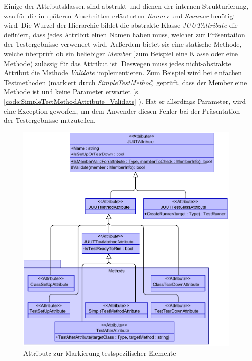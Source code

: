 Einige der Attributsklassen sind abstrakt und dienen der internen Strukturierung, was für die in späteren Abschnitten erläuterten \textit{Runner} und \textit{Scanner} benötigt wird. Die Wurzel der Hierarchie bildet die abstrakte Klasse \textit{JUUTAttribute} die definiert, dass jedes Attribut einen Namen haben muss, welcher zur Präsentation der Testergebnisse verwendet wird. Außerdem bietet sie eine statische Methode, welche überprüft ob ein beliebiger \textit{Member} (zum Beispiel eine Klasse oder eine Methode) zulässig für das Attribut ist. Deswegen muss jedes nicht-abstrakte Attribut die Methode \textit{Validate} implementieren. Zum Beispiel wird bei einfachen Testmethoden (markiert durch \textit{SimpleTestMethod}) geprüft, dass der Member eine Methode ist und keine Parameter erwartet (s. \autoref{code:SimpleTestMethodAttribute_Validate} ). Hat er allerdings Parameter, wird eine Exception geworfen, um dem Anwender diesen Fehler bei der Präsentation der Testergebnisse mitzuteilen.

\begin{figure}[h]
\centering
\includegraphics[width=0.9\linewidth]{images/Kapitel_Ergebnis/Attributes}
\caption[Attribute zur Markierung testspezifischer Elemente]{Attribute zur Markierung testspezifischer Elemente}
\label{fig:Attributes}
\end{figure}

